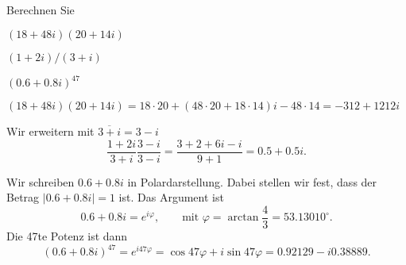 Berechnen Sie
\begin{teilaufgaben}
\item
$(18 + 48i)(20 + 14i)$
\item
$(1+2i)/(3+i)$
\item
$(0.6 + 0.8i)^{47}$
\end{teilaufgaben}

\begin{loesung}
\begin{teilaufgaben}
\item 
$
(18 + 48i)(20 + 14i)
=
18\cdot 20 + (48\cdot 20+18\cdot 14)i-48\cdot 14
=
-312+1212i$
\item Wir erweitern mit $\overline{3+i}=3-i$
\[
\frac{1+2i}{3+i}\frac{3-i}{3-i}
=
\frac{3+2+6i-i}{9+1}
=
0.5+0.5i.
\]
\item
Wir schreiben $0.6+0.8i$ in Polardarstellung.
Dabei stellen wir fest, dass der Betrag $|0.6+0.8i|=1$ ist. Das Argument ist
\[
0.6+0.8i=
e^{i\varphi},\qquad\text{mit $\varphi=\arctan\frac43=53.13010^\circ$}.
\]
Die 47te Potenz ist dann
\[
(0.6+0.8i)^{47}=e^{i47\varphi}
=\cos 47\varphi+i\sin 47\varphi
=0.92129 - i0.38889.
\]
\end{teilaufgaben}
\end{loesung}


